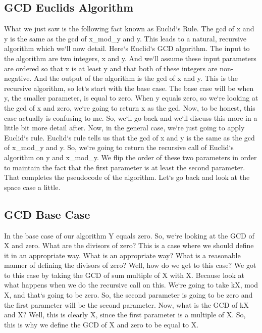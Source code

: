 \subsection{GCD  Euclids Algorithm}
What we just saw is the following fact known as Euclid`s Rule.
The gcd of x and y is the same as the gcd of x\_mod\_y and y.
This leads to a natural, recursive algorithm which we`ll now detail.
Here`s Euclid`s GCD algorithm.
The input to the algorithm are two integers, x and y.
And we`ll assume these input parameters are ordered so that x is at least y and that both of these integers are non-negative.
And the output of the algorithm is the gcd of x and y.
This is the recursive algorithm, so let`s start with the base case.
The base case will be when y, the smaller parameter, is equal to zero.
When y equals zero, so we`re looking at the gcd of x and zero, we`re going to return x as the gcd.
Now, to be honest, this case actually is confusing to me.
So, we`ll go back and we`ll discuss this more in a little bit more detail after.
Now, in the general case, we`re just going to apply Euclid`s rule.
Euclid`s rule tells us that the gcd of x and y is the same as the gcd of x\_mod\_y and y.
So, we`re going to return the recursive call of Euclid`s algorithm on y and x\_mod\_y.
We flip the order of these two parameters in order to maintain the fact that the first parameter is at least the second parameter.
That completes the pseudocode of the algorithm.
Let`s go back and look at the space case a little.

\subsection{GCD  Base Case}
In the base case of our algorithm Y equals zero.
So, we`re looking at the GCD of X and zero.
What are the divisors of zero? This is a case where we should define it in an appropriate way.
What is an appropriate way? What is a reasonable manner of defining the divisors of zero? Well, how do we get to this case? We got to this case by taking the GCD of sum multiple of X with X\@.
Because look at what happens when we do the recursive call on this.
We`re going to take kX, mod X, and that`s going to be zero.
So, the second parameter is going to be zero and the first parameter will be the second parameter.
Now, what is the GCD of kX and X? Well, this is clearly X, since the first parameter is a multiple of X\@.
So, this is why we define the GCD of X and zero to be equal to X\@.

